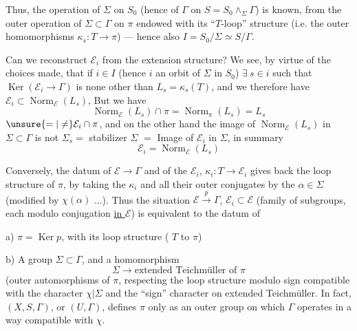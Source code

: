 
Thus, the operation of
$\Sigma$ on $S_0$ (hence of $\Gamma$ on $S=S_0\wedge_{\Sigma}\Gamma$)
is known, from the outer operation of $\Sigma\subset\Gamma$ on
$\pi$ endowed with its ``$T$-loop'' structure 
(i.e. the outer homomorphisms
$\kappa_s:T\longrightarrow\pi$) --- hence also $I=S_0/\Sigma\simeq S/\Gamma$.

Can we reconstruct $\mathcal E_i$  from the
extension structure? We see, 
by virtue of the choices made,
that if $i\in I$ (hence $i$ an orbit of
$\Sigma$ in $S_0$) $\exists\ s\in i$ such that $\operatorname{Ker}(\mathcal E_i\longrightarrow\Gamma)$
is none other than $L_s=\kappa_s(T)$, and we
therefore have $\mathcal E_i\subset\operatorname{Norm}_{\mathcal E}(L_s)$, But
we have
\[
\operatorname{Norm}_{\mathcal E}(L_s)\cap\pi
=\operatorname{Norm}_{\pi}(L_s)=L_s
\]
$\unsure{=|\ne}\mathcal E_i\cap\pi$, and on the other hand the image of
$\operatorname{Norm}_{\mathcal E}(L_s)$ in $\Sigma\subset\Gamma$ is not  \inserted{$\subset$}
$\Sigma_s=$ stabilizer   $\Sigma$
$=$ Image of $\mathcal E_i$ in $\Sigma$,
 in summary
\[
\mathcal E_i=\operatorname{Norm}_{\mathcal E}(L_s)
\]


Conversely, the datum of $\mathcal E\longrightarrow\Gamma$
and of the $\mathcal E_i$, $\kappa_i:T\longrightarrow\mathcal E_i$ gives back the
loop structure of $\pi$, by taking
the $\kappa_i$ and all their  outer
conjugates by the $\alpha\in\Sigma$ (modified by $\chi(\alpha)$ ...).
Thus the  situation $\mathcal E\xrightarrow{p}\Gamma$, $\mathcal E_i\subset\mathcal E$
 (family of subgroups, each
 modulo conjugation \uline{in $\mathcal E$}) is equivalent
to the datum of

a) $\pi=\operatorname{Ker}p$, with its loop structure
(
$T$ to $\pi$)

b) A  group $\Sigma\subset\Gamma$, and
a homomorphism
\[
\Sigma\longrightarrow\text{extended Teichmüller of }\pi
\]
(outer automorphisms of $\pi$,
respecting the loop structure
modulo sign
compatible with the character $\chi|\Sigma$ and
the ``sign'' character on extended Teichmüller.
In fact, $(X,S,\Gamma)$, or $(U,\Gamma)$, defines
$\pi$ only as an outer group  on which
$\Gamma$ operates in a way compatible with $\chi$.
